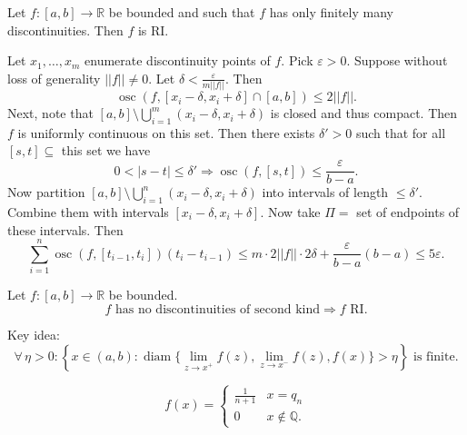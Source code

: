 \documentclass{notes}
\begin{document}
  \begin{lem}
    Let $f \colon [a, b] \to \mathbb R$ be bounded and such that $f$ has only finitely many discontinuities.
    Then $f$ is RI.
  \end{lem}
  
  \begin{prf}
    Let $x_1, \dots, x_m$ enumerate discontinuity points of $f$.
    Pick $\varepsilon > 0$.
    Suppose without loss of generality $||f|| \neq 0$.
    Let $\delta < \frac{\varepsilon}{m ||f||}$.
    Then 
    \[
      \operatorname{osc}(f, [x_i - \delta, x_i + \delta] \cap [a, b]) \leq 2 ||f||.
    \]
    Next, note that $[a, b] \setminus \bigcup_{i = 1}^m (x_i - \delta, x_i + \delta)$ is closed and thus compact.
    Then $f$ is uniformly continuous on this set.
    Then there exists $\delta' > 0$ such that for all $[s, t] \subseteq $ this set we have 
    \[
      0 < \left | s - t \right | \leq \delta' \Rightarrow \operatorname{osc}(f, [s, t]) \leq \frac{\varepsilon}{b - a}.
    \]
    Now partition $[a, b] \setminus \bigcup_{i = 1}^n (x_i - \delta, x_i + \delta)$ into intervals of length $\leq \delta'$.
    Combine them with intervals $[x_i - \delta, x_i + \delta]$.
    Now take $\Pi = $ set of endpoints of these intervals.
    Then 
    \[
      \sum_{i = 1}^n \operatorname{osc}(f, [t_{i - 1}, t_i]) (t_i - t_{i - 1}) \leq m \cdot 2 ||f|| \cdot 2 \delta + \frac{\varepsilon}{b - a} (b - a) \leq 5 \varepsilon.
    \]
  \end{prf}
  
  \begin{lem}
    Let $f \colon [a, b] \to \mathbb R$ be bounded.
    \[
      \text{$f$ has no discontinuities of second kind} \Rightarrow \text{$f$ RI}.
    \]
  \end{lem}
  
  \begin{prf}
    Key idea: 
    \[
      \forall \, \eta > 0: \left \{ x \in (a, b) : \operatorname{diam}\{ \lim_{z \to x^+} f(z), \lim_{z \to x^-} f(z), f(x) \} > \eta \right \} \text{ is finite}.
    \]
  \end{prf}
  
  \begin{eg}
    \[
      f(x) = \begin{cases}
        \frac{1}{n + 1} & x = q_n \\ 
        0 & x \not \in \mathbb Q.
      \end{cases}
    \]
  \end{eg}
  
\end{document}
